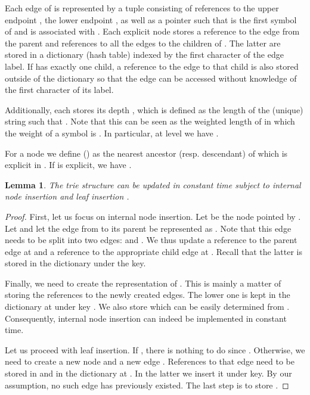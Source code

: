 \documentclass[a4paper]{article}
\newtheorem{lemma}[theorem]{Lemma}
\theoremstyle{remark}
\begin{document}
Each edge of  is represented by a tuple consisting of references to the upper endpoint , the lower endpoint ,
as well as a pointer  such that  is the first symbol of  and  is associated with .
Each explicit node  stores a reference to the edge from the parent
and references to all the edges to the children of .
The latter are stored in a dictionary (hash table) indexed by the first character of the edge label.
If  has exactly one child, a reference to the edge to that child is also stored outside of the dictionary
so that the edge can be accessed without knowledge of the first character of its label.

Additionally, each  stores its depth , which is defined as the length
of the (unique) string  such that .
Note that this can be seen as the weighted length of  in which the weight of a symbol  is .
In particular, at level  we have .





\newcommand{\tanc}{\mathtt{anc}}
\newcommand{\tdesc}{\mathtt{desc}}
For a node  we define  () as the nearest ancestor (resp. descendant)
of  which is explicit in . If  is explicit, we have .




\begin{lemma}\label{lem:structure}
The trie structure can be updated in constant time subject to internal node insertion  and leaf insertion .
\end{lemma}
\begin{proof}
First, let us focus on internal node insertion. Let  be the node pointed by .
Let  and let the edge from  to its parent be represented as .
Note that this edge needs to be split into two edges:  and .
We thus update a reference to the parent edge at 
and a reference to the appropriate child edge at .
Recall that the latter is stored in the dictionary under the  key.

Finally, we need to create the representation of .
This is mainly a matter of storing the references to the newly created edges.
The lower one is kept in the dictionary at  under key .
We also store  which can be easily determined from .
Consequently, internal node insertion can indeed be implemented in constant time.

Let us proceed with leaf insertion. If , there is nothing to do since .
Otherwise, we need to create a new node  and a new edge .
References to that edge need to be stored in  and in the dictionary at .
In the latter we insert it under  key. By our assumption,
no such edge has previously existed. The last step is to store .
\end{proof}
\end{document}
